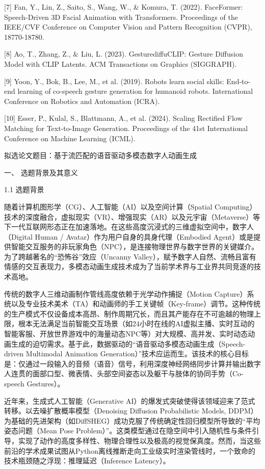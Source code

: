 \documentclass[UTF8]{ctexart}
\begin{document}
{[}7{]} Fan, Y., Lin, Z., Saito, S., Wang, W., \& Komura, T. (2022).
FaceFormer: Speech-Driven 3D Facial Animation with Transformers.
Proceedings of the IEEE/CVF Conference on Computer Vision and Pattern
Recognition (CVPR), 18770-18780.

{[}8{]} Ao, T., Zhang, Z., \& Liu, L. (2023). GesturediffuCLIP: Gesture
Diffusion Model with CLIP Latents. ACM Transactions on Graphics
(SIGGRAPH).

{[}9{]} Yoon, Y., Bok, B., Lee, M., et al. (2019). Robots learn social
skills: End-to-end learning of co-speech gesture generation for humanoid
robots. International Conference on Robotics and Automation (ICRA).

{[}10{]} Esser, P., Kulal, S., Blattmann, A., et al. (2024). Scaling
Rectified Flow Matching for Text-to-Image Generation. Proceedings of the
41st International Conference on Machine Learning (ICML).

拟选论文题目：基于流匹配的语音驱动多模态数字人动画生成

一、 选题背景及其意义

1.1 选题背景

随着计算机图形学（CG）、人工智能（AI）以及空间计算（Spatial
Computing）技术的深度融合，虚拟现实（VR）、增强现实（AR）以及元宇宙（Metaverse）等下一代互联网形态正在加速落地。在这些高度沉浸式的三维虚拟空间中，数字人（Digital
Human / Avatar）作为用户自身的具身代理（Embodied
Agent）或是提供智能交互服务的非玩家角色（NPC），是连接物理世界与数字世界的关键媒介。为了跨越著名的``恐怖谷''效应（Uncanny
Valley），赋予数字人自然、流畅且富有情感的交互表现力，多模态动画生成技术成为了当前学术界与工业界共同竞逐的技术高地。

传统的数字人三维动画制作管线高度依赖于光学动作捕捉（Motion
Capture）系统以及专业技术美术（TA）和动画师的手工关键帧（Key-frame）调节。这种传统的生产模式不仅设备成本高昂、制作周期冗长，而且其产能存在不可逾越的物理上限，根本无法满足当前智能交互场景（如24小时在线的AI虚拟主播、实时互动的智能客服、开放世界游戏中的海量动态NPC等）对大规模、高并发、实时动态动画生成的迫切需求。基于此，数据驱动的``语音驱动多模态动画生成（Speech-driven
Multimodal Animation
Generation）''技术应运而生。该技术的核心目标是：仅通过一段输入的音频（语音）信号，利用深度神经网络同步计算并输出数字人连贯的面部口型、微表情、头部空间姿态以及躯干与肢体的协同手势（Co-speech
Gestures）。

近年来，生成式人工智能（Generative
AI）的爆发式突破使得该领域迎来了范式转移。以去噪扩散概率模型（Denoising
Diffusion Probabilistic Models,
DDPM）为基础的先进架构（如DiffSHEG）成功克服了传统确定性回归模型所导致的``平均姿态问题（Mean
Pose
Problem）''。这类模型通过在隐空间中引入随机性与条件引导，实现了动作的高度多样性、物理合理性以及极高的视觉保真度。然而，当这些前沿的学术成果试图从Python离线推断走向工业级实时渲染管线时，一个致命的技术瓶颈随之浮现：推理延迟（Inference
Latency）。
\end{document}
